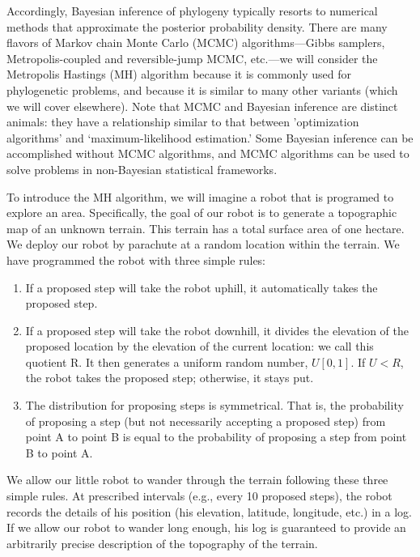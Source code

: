 \documentclass[11pt]{article}
\begin{document}
Accordingly, Bayesian inference of phylogeny typically resorts to numerical methods that approximate the posterior probability density. There are many flavors of Markov chain Monte Carlo (MCMC) algorithms—Gibbs samplers, Metropolis-coupled and reversible-jump MCMC, etc.—we will consider the Metropolis Hastings (MH) algorithm because it is commonly used for phylogenetic problems, and because it is similar to many other variants (which we will cover elsewhere). Note that MCMC and Bayesian inference are distinct animals: they have a relationship similar to that between ’optimization algorithms’ and ‘maximum-likelihood estimation.’ Some Bayesian inference can be accomplished without MCMC algorithms, and MCMC algorithms can be used to solve problems in non-Bayesian statistical frameworks.

To introduce the MH algorithm, we will imagine a robot that is programed to explore an area. Specifically, the goal of our robot is to generate a topographic map of an unknown terrain. This terrain has a total surface area of one hectare. We deploy our robot by parachute at a random location within the terrain. We have programmed the robot with three simple rules:

\begin{enumerate}
\item{If a proposed step will take the robot uphill, it automatically takes the proposed step.}

\item{If a proposed step will take the robot downhill, it divides the elevation of the proposed location by the elevation of the current location: we call this quotient R. It then generates a uniform random number, $U[0,1]$. If $U<R$, the robot takes the proposed step; otherwise, it stays put.}

\item{The distribution for proposing steps is symmetrical. That is, the probability of proposing a step (but not necessarily accepting a proposed step) from point A to point B is equal to the probability of proposing a step from point B to point A.}
\end{enumerate}

We allow our little robot to wander through the terrain following these three simple rules. At prescribed intervals (e.g., every 10 proposed steps), the robot records the details of his position (his elevation, latitude, longitude, etc.) in a log. If we allow our robot to wander long enough, his log is guaranteed to provide an arbitrarily precise description of the topography of the terrain. 
\end{document}
